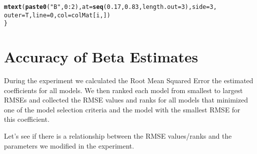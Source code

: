 \documentclass{article}\usepackage[]{graphicx}\usepackage[]{color}
\makeatletter
\newcommand{\hlnum}[1]{\textcolor[rgb]{0.686,0.059,0.569}{#1}}%
\newcommand{\hlstr}[1]{\textcolor[rgb]{0.192,0.494,0.8}{#1}}%
\newcommand{\hlopt}[1]{\textcolor[rgb]{0,0,0}{#1}}%
\newcommand{\hlstd}[1]{\textcolor[rgb]{0.345,0.345,0.345}{#1}}%
\newcommand{\hlkwc}[1]{\textcolor[rgb]{0.333,0.667,0.333}{#1}}%
\newcommand{\hlkwd}[1]{\textcolor[rgb]{0.737,0.353,0.396}{\textbf{#1}}}%
\newenvironment{kframe}{%
 \def\at@end@of@kframe{}%
 \ifinner\ifhmode%
  \def\at@end@of@kframe{\end{minipage}}%
  \begin{minipage}{\columnwidth}%
 \fi\fi%
 \def\FrameCommand##1{\hskip\@totalleftmargin \hskip-\fboxsep
 \colorbox{shadecolor}{##1}\hskip-\fboxsep
     \hskip-\linewidth \hskip-\@totalleftmargin \hskip\columnwidth}%
 \MakeFramed {\advance\hsize-\width
   \@totalleftmargin\z@ \linewidth\hsize
   \@setminipage}}%
 {\par\unskip\endMakeFramed%
 \at@end@of@kframe}
\newenvironment{knitrout}{}{} %
\makeatother
\begin{document}
\begin{knitrout}
\begin{kframe}
\begin{alltt}
    \hlkwd{mtext}\hlstd{(}\hlkwd{paste0}\hlstd{(}\hlstr{"B"}\hlstd{,} \hlnum{0}\hlopt{:}\hlnum{2}\hlstd{),} \hlkwc{at} \hlstd{=} \hlkwd{seq}\hlstd{(}\hlnum{0.17}\hlstd{,} \hlnum{0.83}\hlstd{,} \hlkwc{length.out} \hlstd{=} \hlnum{3}\hlstd{),} \hlkwc{side} \hlstd{=} \hlnum{3}\hlstd{,}
        \hlkwc{outer} \hlstd{= T,} \hlkwc{line} \hlstd{=} \hlnum{0}\hlstd{,} \hlkwc{col} \hlstd{= colMat[i, ])}
\hlstd{\}}
\end{alltt}
\end{kframe}








\end{knitrout}



\section{Accuracy of Beta Estimates}

During the experiment we calculated the Root Mean Squared Error the estimated coefficients for all models. We then ranked each model from smallest to largest RMSEs and collected the RMSE values and ranks for all models that minimized one of the model selection criteria and the model with the smallest RMSE for this coefficient. 

Let's see if there is a relationship between the RMSE values/ranks and the parameters we modified in the experiment.
\end{document}
